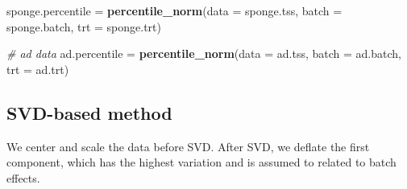\documentclass[]{book}
\newenvironment{Shaded}{\begin{snugshade}}{\end{snugshade}}
\newcommand{\KeywordTok}[1]{\textcolor[rgb]{0.13,0.29,0.53}{\textbf{#1}}}
\newcommand{\DataTypeTok}[1]{\textcolor[rgb]{0.13,0.29,0.53}{#1}}
\newcommand{\StringTok}[1]{\textcolor[rgb]{0.31,0.60,0.02}{#1}}
\newcommand{\CommentTok}[1]{\textcolor[rgb]{0.56,0.35,0.01}{\textit{#1}}}
\newcommand{\NormalTok}[1]{#1}
\begin{document}
\begin{Shaded}
\begin{Highlighting}[]
\NormalTok{sponge.percentile =}\StringTok{ }\KeywordTok{percentile_norm}\NormalTok{(}\DataTypeTok{data =}\NormalTok{ sponge.tss, }\DataTypeTok{batch =}\NormalTok{ sponge.batch, }\DataTypeTok{trt =}\NormalTok{ sponge.trt)}

\CommentTok{# ad data}
\NormalTok{ad.percentile =}\StringTok{ }\KeywordTok{percentile_norm}\NormalTok{(}\DataTypeTok{data =}\NormalTok{ ad.tss, }\DataTypeTok{batch =}\NormalTok{ ad.batch, }\DataTypeTok{trt =}\NormalTok{ ad.trt)}
\end{Highlighting}
\end{Shaded}

\subsection{SVD-based method}\label{svd-based-method}

We center and scale the data before SVD. After SVD, we deflate the first
component, which has the highest variation and is assumed to related to
batch effects.
\end{document}
